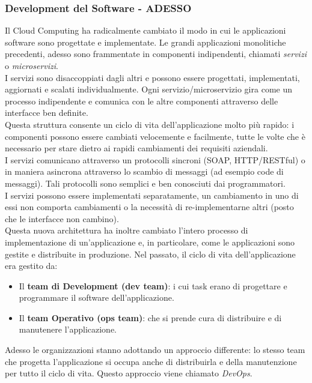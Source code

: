 \documentclass{article}
\begin{document}
\subsubsection{Development del Software - ADESSO}
Il Cloud Computing ha radicalmente cambiato il modo in cui le applicazioni software sono progettate e implementate. Le grandi applicazioni monolitiche precedenti, adesso sono frammentate in componenti indipendenti, chiamati \textit{servizi} o \textit{microservizi}. \\ 
I servizi sono disaccoppiati dagli altri e possono essere progettati, implementati, aggiornati e scalati individualmente. Ogni servizio/microservizio gira come un processo indipendente e comunica con le altre componenti attraverso delle interfacce ben definite. \\
Questa struttura consente un ciclo di vita dell'applicazione molto più rapido: i componenti possono essere cambiati velocemente e facilmente, tutte le volte che è necessario per stare dietro ai rapidi cambiamenti dei requisiti aziendali. \\
I servizi comunicano attraverso un protocolli sincroni (SOAP, HTTP/RESTful) o in maniera asincrona attraverso lo scambio di messaggi (ad esempio code di messaggi). Tali protocolli sono semplici e ben conosciuti dai programmatori. \\
I servizi possono essere implementati separatamente, un cambiamento in uno di essi non comporta cambiamenti o la necessità di  re-implementarne altri (posto che le interfacce non cambino). \\
Questa nuova architettura ha inoltre cambiato l'intero processo di implementazione di un'applicazione e, in particolare, come le applicazioni sono gestite e distribuite in produzione. Nel passato, il ciclo di vita dell'applicazione era gestito da:
\begin{itemize}
    \item Il \textbf{team di Development (dev team)}: i cui task erano di progettare e programmare il software dell'applicazione.
    \item Il \textbf{team Operativo (ops team)}: che si prende cura di distribuire e di manutenere l'applicazione. 
\end{itemize}
Adesso le organizzazioni stanno adottando un approccio differente: lo stesso team che progetta l'applicazione si occupa anche di distribuirla e della manutenzione per tutto il ciclo di vita. Questo approccio viene chiamato \textit{DevOps}.
\end{document}
